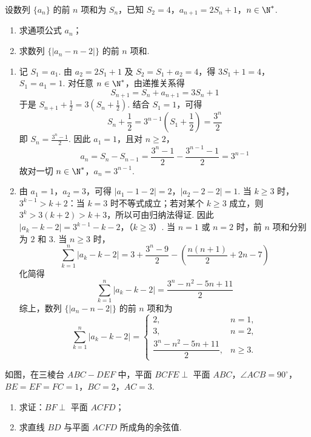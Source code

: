 \begin{problem}
设数列 \(\{a_n\}\) 的前 \(n\) 项和为 \(S_n\)，已知 \(S_2=4\)，\(a_{n+1}=2S_n+1\)，\(n\in\N^*\).

\begin{enumerate}
\item 求通项公式 \(a_n\)；
\item 求数列 \(\{|a_n-n-2|\}\) 的前 \(n\) 项和.
\end{enumerate}
\end{problem}

\begin{solution}
\begin{enumerate}
\item 记 \(S_1=a_1\). 由 \(a_2=2S_1+1\) 及 \(S_2=S_1+a_2=4\)，得
\(3S_1+1=4\)，\(S_1=a_1=1\).
对任意 \(n\in\N^*\)，由递推关系得
\[
S_{n+1}=S_n+a_{n+1}=3S_n+1
\]
于是 \(S_{n+1}+\frac12=3\left(S_n+\frac12\right)\). 结合 \(S_1=1\)，可得
\[
S_n+\frac12=3^{n-1}\left(S_1+\frac12\right)=\frac{3^n}{2}
\]
即 \(S_n=\frac{3^n-1}{2}\). 因此 \(a_1=1\)，且对 \(n\geqslant2\)，
\[
a_n=S_n-S_{n-1}=\frac{3^n-1}{2}-\frac{3^{n-1}-1}{2}=3^{n-1}
\]
故对一切 \(n\in\N^*\)，\(a_n=3^{n-1}\).

\item 由 \(a_1=1\)，\(a_2=3\)，可得
\(|a_1-1-2|=2\)，\(|a_2-2-2|=1\).
当 \(k\geqslant3\) 时，\(3^{k-1}>k+2\)：当 \(k=3\) 时不等式成立；若对某个 \(k\geqslant3\) 成立，则 \(3^k>3(k+2)>k+3\)，所以可由归纳法得证. 因此
\(|a_k-k-2|=3^{k-1}-k-2\)，（\(k\geqslant3\)）.
当 \(n=1\) 或 \(n=2\) 时，前 \(n\) 项和分别为 \(2\) 和 \(3\). 当 \(n\geqslant3\) 时，
\[
\sum_{k=1}^{n}|a_k-k-2|=3+\frac{3^n-9}{2}-\left(\frac{n(n+1)}2+2n-7\right)
\]
化简得
\[
\sum_{k=1}^{n}|a_k-k-2|=\frac{3^n-n^2-5n+11}{2}
\]
综上，数列 \(\{|a_n-n-2|\}\) 的前 \(n\) 项和为
\[
\sum_{k=1}^{n}|a_k-k-2|=
\begin{cases}
2, & n=1,\\
3, & n=2,\\
\dfrac{3^n-n^2-5n+11}{2}, & n\geqslant3.
\end{cases}
\]
\end{enumerate}
\end{solution}

\begin{problem}
如图，在三棱台 \(ABC-DEF\) 中，平面 \(BCFE\perp\) 平面 \(ABC\)，\(\angle ACB=90^\circ\)，\(BE=EF=FC=1\)，\(BC=2\)，\(AC=3\).

\begin{enumerate}
\item 求证：\(BF\perp\) 平面 \(ACFD\)；
\item 求直线 \(BD\) 与平面 \(ACFD\) 所成角的余弦值.
\end{enumerate}

\end{problem}

